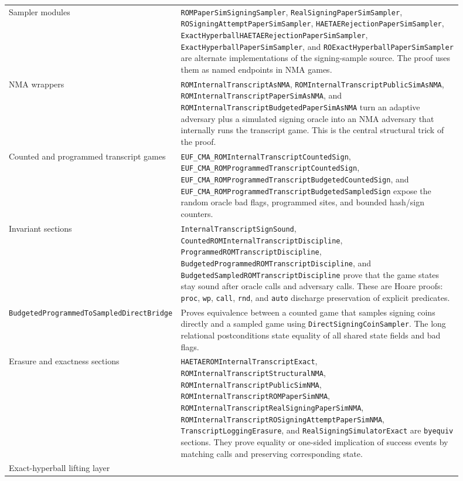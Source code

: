 \documentclass[11pt]{report}
\DeclareRobustCommand{\ec}[1]{\ifmmode\text{\nolinkurl{#1}}\else\nolinkurl{#1}\fi}
\theoremstyle{definition}
\theoremstyle{plain}
\begin{document}
\begin{longtable}{p{0.28\linewidth}p{0.62\linewidth}}
Sampler modules &
\ec{ROMPaperSimSigningSampler}, \ec{RealSigningPaperSimSampler},
\ec{ROSigningAttemptPaperSimSampler}, \ec{HAETAERejectionPaperSimSampler},
\ec{ExactHyperballHAETAERejectionPaperSimSampler},
\ec{ExactHyperballPaperSimSampler}, and \ec{ROExactHyperballPaperSimSampler}
are alternate implementations of the signing-sample source.  The proof uses
them as named endpoints in NMA games. \\
NMA wrappers &
\ec{ROMInternalTranscriptAsNMA},
\ec{ROMInternalTranscriptPublicSimAsNMA},
\ec{ROMInternalTranscriptPaperSimAsNMA}, and
\ec{ROMInternalTranscriptBudgetedPaperSimAsNMA} turn an adaptive adversary plus
a simulated signing oracle into an NMA adversary that internally runs the
transcript game.  This is the central structural trick of the proof. \\
Counted and programmed transcript games &
\ec{EUF\_CMA\_ROMInternalTranscriptCountedSign},
\ec{EUF\_CMA\_ROMProgrammedTranscriptCountedSign},
\ec{EUF\_CMA\_ROMProgrammedTranscriptBudgetedCountedSign}, and
\ec{EUF\_CMA\_ROMProgrammedTranscriptBudgetedSampledSign} expose the random
oracle bad flags, programmed sites, and bounded hash/sign counters. \\
Invariant sections &
\ec{InternalTranscriptSignSound},
\ec{CountedROMInternalTranscriptDiscipline},
\ec{ProgrammedROMTranscriptDiscipline},
\ec{BudgetedProgrammedROMTranscriptDiscipline}, and
\ec{BudgetedSampledROMTranscriptDiscipline} prove that the game states stay
sound after oracle calls and adversary calls.  These are Hoare proofs:
\ec{proc}, \ec{wp}, \ec{call}, \ec{rnd}, and \ec{auto} discharge preservation
of explicit predicates. \\
\ec{BudgetedProgrammedToSampledDirectBridge} &
Proves equivalence between a counted game that samples signing coins directly
and a sampled game using \ec{DirectSigningCoinSampler}.  The long relational
postconditions state equality of all shared state fields and bad flags. \\
Erasure and exactness sections &
\ec{HAETAEROMInternalTranscriptExact},
\ec{ROMInternalTranscriptStructuralNMA},
\ec{ROMInternalTranscriptPublicSimNMA},
\ec{ROMInternalTranscriptROMPaperSimNMA},
\ec{ROMInternalTranscriptRealSigningPaperSimNMA},
\ec{ROMInternalTranscriptROSigningAttemptPaperSimNMA},
\ec{TranscriptLoggingErasure}, and \ec{RealSigningSimulatorExact} are
\ec{byequiv} sections.  They prove equality or one-sided implication of success
events by matching calls and preserving corresponding state. \\
Exact-hyperball lifting layer &

\end{longtable}
\end{document}
